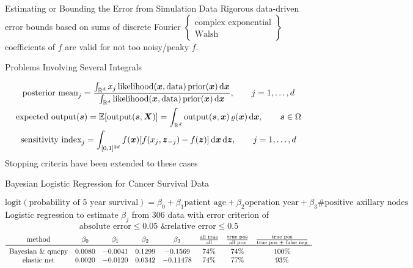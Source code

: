 \documentclass[10pt,compress,xcolor={usenames,dvipsnames},aspectratio=169]{beamer}
\begin{document}
\begin{frame}{Estimating or Bounding the Error from Simulation Data}
{Rigorous data-driven error bounds  based on sums of discrete Fourier $\begin{Bmatrix} \text{complex exponential} \\ \text{Walsh}\end{Bmatrix}$ coefficients of $f$ are valid for not too noisy/peaky $f$.}


\end{frame}

\begin{frame}{Problems Involving Several Integrals}

	\vspace{-10ex}
\begin{gather*}
	\text{posterior mean}_j =
	\frac{  \int_{\mathbb{R}^d} x_j \, \text{likelihood}(\boldsymbol{x},\text{data}) \, \text{prior}(\boldsymbol{x}) \, {\rm d}  \boldsymbol{x}}
	{ \int_{\mathbb{R}^d} \text{likelihood}(\boldsymbol{x},\text{data}) \, \text{prior}(\boldsymbol{x}) \, {\rm d}  \boldsymbol{x}}
	, \qquad j =1, \ldots, d \\
	\text{expected output}(\boldsymbol{s})  = \operatorname{\mathbb{E}}[\text{output}(\boldsymbol{s},\boldsymbol{X})] =  \int_{\mathbb{R}^d} \text{output}(\boldsymbol{s},\boldsymbol{x}) \, \varrho(\boldsymbol{x}) \, {\rm d} \boldsymbol{x} , \qquad \boldsymbol{s} \in \Omega\\
	\text{sensitivity index}_j = \int_{[0,1]^{2d}} f(\boldsymbol{x})[f(x_j,\boldsymbol{z}_{-j}) - f(\boldsymbol{z})] \, {\rm d} \boldsymbol{x} \,{\rm d} \boldsymbol{z}, \qquad j =1, \ldots, d
\end{gather*}
Stopping criteria have been extended to these cases
\end{frame}


\begin{frame}{Bayesian Logistic Regression for Cancer Survival Data}

	\vspace{-10ex}
	\[
	\text{logit}(\text{probability of $5$ year survival}) = \beta_0 + \beta_1 \text{patient age} + \beta_2 \text{operation year} + \beta_3 \text{\# positive axillary nodes}
	\]
	Logistic regression to estimate $\beta_j$ from 306 data with error criterion of
	\[
	\text{absolute error} \le 0.05 \text{ \& } \text{relative error} \le 0.5
	\]
	\[
	\begin{array}{cccccccc}
		\text{method} & \beta_0 & \beta_1 & \beta_2  & \beta_3
		& \frac{\text{all true}}{\text{all}} & \frac{\text{true pos}}{\text{all pos}} & \frac{\text{true pos}}{\text{true pos $+$ false neg}} \\
		\toprule
		\text{Bayesian \& qmcpy} & 0.0080 & -0.0041 & 0.1299 & -0.1569 & 74\% & 74\% & 100\%\\
		\text{elastic net} & 0.0020 & -0.0120 &  0.0342 &  -0.11478 &  74\% & 77\% & 93\%\\
	\end{array}
	\]
\end{frame}
\end{document}
